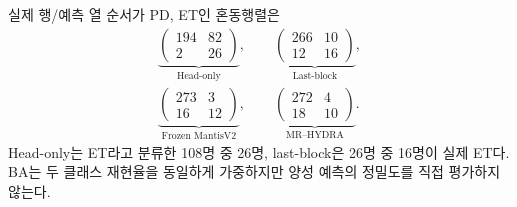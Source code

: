 \documentclass[11pt,a4paper]{article}
\begin{document}
실제 행/예측 열 순서가 PD, ET인 혼동행렬은
\begin{equation}
 \begin{gathered}
 \underbrace{\begin{pmatrix}194&82\\2&26\end{pmatrix}}_{\text{Head-only}},\qquad
 \underbrace{\begin{pmatrix}266&10\\12&16\end{pmatrix}}_{\text{Last-block}},\\[.8em]
 \underbrace{\begin{pmatrix}273&3\\16&12\end{pmatrix}}_{\text{Frozen MantisV2}},\qquad
 \underbrace{\begin{pmatrix}272&4\\18&10\end{pmatrix}}_{\text{MR--HYDRA}}.
 \end{gathered}
\end{equation}
Head-only는 ET라고 분류한 108명 중 26명, last-block은 26명 중 16명이 실제 ET다.
BA는 두 클래스 재현율을 동일하게 가중하지만 양성 예측의 정밀도를 직접 평가하지 않는다.
\clearpage
\end{document}
